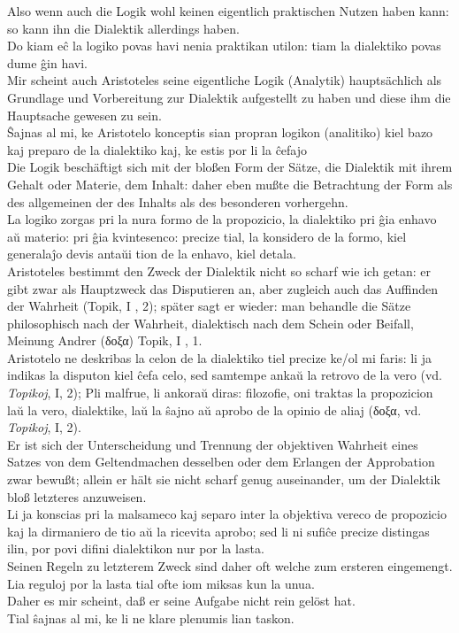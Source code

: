 \documentclass{book}
\newcommand{\de}[1]{{\color{red}#1}\\}
\newcommand{\eo}[1]{#1\\}
\newcommand{\eble}[1]{{\color{blue}#1}}
\begin{document}
\de{Also wenn auch die Logik wohl keinen eigentlich praktischen Nutzen
haben kann: so kann ihn die Dialektik allerdings haben. }
\eo{Do kiam eĉ la logiko povas havi nenia praktikan utilon: tiam la
dialektiko povas dume ĝin havi.}
\de{Mir scheint auch Aristoteles seine eigentliche Logik (Analytik)
hauptsächlich als Grundlage und Vorbereitung zur Dialektik aufgestellt zu
haben und diese ihm die Hauptsache gewesen zu sein. }
\eo{Ŝajnas al mi, ke Aristotelo konceptis sian propran logikon
(analitiko) kiel bazo kaj preparo de la dialektiko kaj, ke estis por li
la \eble{ĉefajo}}
\de{Die Logik beschäftigt sich mit der bloßen Form der Sätze, die
Dialektik mit ihrem Gehalt oder Materie, dem Inhalt: daher eben mußte die
Betrachtung der Form als des allgemeinen der des Inhalts als des
besonderen vorhergehn.}
\eo{La logiko zorgas pri la nura formo de la propozicio, la dialektiko
pri ĝia enhavo aŭ materio: pri ĝia kvintesenco: precize tial, la
konsidero de la formo, kiel \eble{generalaĵo} devis antaŭi tion de la
enhavo, kiel detala.}


\de{Aristoteles bestimmt den Zweck der Dialektik nicht so scharf wie ich
getan: er gibt zwar als Hauptzweck das Disputieren an, aber zugleich auch
das Auffinden der Wahrheit (Topik, I , 2); später sagt er wieder: man
behandle die Sätze philosophisch nach der Wahrheit, dialektisch nach dem
Schein oder Beifall, Meinung Andrer (\textgreek{δοξα}) Topik, I , 1.}
\eo{Aristotelo ne deskribas la celon de la dialektiko tiel precize
\eble{ke/ol} mi faris: li ja indikas la disputon kiel ĉefa celo, sed
samtempe ankaŭ la retrovo de la vero (vd. \textit{Topikoj}, I, 2); Pli
malfrue, li ankoraŭ diras: filozofie, oni traktas la propozicion laŭ la
vero, dialektike, laŭ la ŝajno aŭ aprobo de la opinio de aliaj
(\textgreek{δοξα}, vd. \textit{Topikoj}, I, 2).}
\de{Er ist sich der Unterscheidung und Trennung der objektiven Wahrheit
eines Satzes von dem Geltendmachen desselben oder dem Erlangen der
Approbation zwar bewußt; allein er hält sie nicht scharf genug
auseinander, um der Dialektik bloß letzteres anzuweisen.}
\eo{Li ja konscias pri la malsameco kaj separo inter la objektiva vereco
de propozicio kaj la dirmaniero de tio aŭ la ricevita aprobo; sed li ni
sufiĉe precize distingas ilin, por povi difini dialektikon nur \eble{por
la lasta}.}
\de{Seinen Regeln zu letzterem Zweck sind daher oft welche zum ersteren
eingemengt.}
\eo{Lia reguloj por la lasta tial ofte iom miksas kun la unua.}
\de{Daher es mir scheint, daß er seine Aufgabe nicht rein gelöst hat.}
\eo{Tial ŝajnas al mi, ke li ne klare plenumis lian taskon.}
\end{document}
